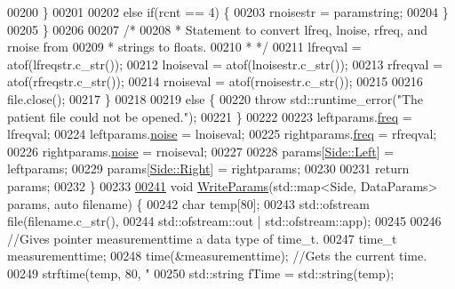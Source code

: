 \begin{DoxyCode}
00200                 \}
00201 
00202                 \textcolor{keywordflow}{else} \textcolor{keywordflow}{if}(rcnt == 4) \{
00203                     rnoisestr = paramstring;
00204                 \}
00205             \}
00206 
00207             \textcolor{comment}{/*}
00208 \textcolor{comment}{             * Statement to convert lfreq, lnoise, rfreq, and rnoise from}
00209 \textcolor{comment}{             * strings to floats.}
00210 \textcolor{comment}{             * */}
00211             lfreqval = atof(lfreqstr.c\_str());
00212             lnoiseval = atof(lnoisestr.c\_str());
00213             rfreqval = atof(rfreqstr.c\_str());
00214             rnoiseval = atof(rnoisestr.c\_str());
00215 
00216             file.close();
00217         \}
00218 
00219         \textcolor{keywordflow}{else} \{
00220             \textcolor{keywordflow}{throw} std::runtime\_error(\textcolor{stringliteral}{"The patient file could not be opened."});
00221         \}
00222 
00223         leftparams.\hyperlink{structDataParams_a12566e017407647bc8287d62554ad3fb}{freq} = lfreqval;
00224         leftparams.\hyperlink{structDataParams_a4efd1d2231c6fa7c878c9d5e1650738f}{noise} = lnoiseval;
00225         rightparams.\hyperlink{structDataParams_a12566e017407647bc8287d62554ad3fb}{freq} = rfreqval;
00226         rightparams.\hyperlink{structDataParams_a4efd1d2231c6fa7c878c9d5e1650738f}{noise} = rnoiseval;
00227 
00228         params[\hyperlink{namespaceavda_af723e82f0d3d45fda6fdc01f6a492786a945d5e233cf7d6240f6b783b36a374ff}{Side::Left}] = leftparams;
00229         params[\hyperlink{namespaceavda_af723e82f0d3d45fda6fdc01f6a492786a92b09c7c48c520c3c55e497875da437c}{Side::Right}] = rightparams;
00230 
00231         \textcolor{keywordflow}{return} params;
00232     \}
00233 
\hypertarget{fileio_8hpp_source_l00241}{}\hyperlink{namespaceavda_a1e3f5a0eb4ee9a7010d57dc38bd8dfec}{00241}     \textcolor{keywordtype}{void} \hyperlink{namespaceavda_a1e3f5a0eb4ee9a7010d57dc38bd8dfec}{WriteParams}(std::map<Side, DataParams> params, \textcolor{keyword}{auto} filename) \{
00242         \textcolor{keywordtype}{char} temp[80];
00243         std::ofstream file(filename.c\_str(),
00244                 std::ofstream::out | std::ofstream::app);
00245 
00246         \textcolor{comment}{//Gives pointer measurementtime a data type of time\_t.}
00247         time\_t measurementtime;
00248         time(&measurementtime); \textcolor{comment}{//Gets the current time.}
00249         strftime(temp, 80, \textcolor{stringliteral}{"%
00250         std::string fTime = std::string(temp);
}
\end{DoxyCode}
